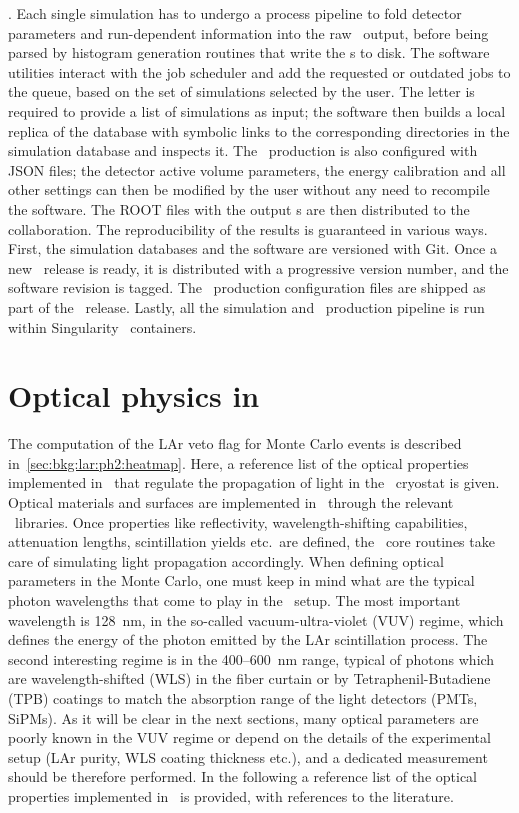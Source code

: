 $${}. Each single simulation has to undergo a process pipeline to fold detector parameters
and run-dependent information into the raw \mage\ output, before being parsed by histogram
generation routines that write the \pdf{}s to disk. The software utilities interact with the
job scheduler and add the requested or outdated jobs to the queue, based on the set of
simulations selected by the user. The letter is required to provide a list of simulations
as input; the software then builds a local replica of the database with symbolic links to
the corresponding directories in the simulation database and inspects it. The \pdf\
production is also configured with JSON files; the detector active volume parameters, the
energy calibration and all other settings can then be modified by the user without any
need to recompile the software. The ROOT files with the output \pdf{}s are then distributed
to the collaboration.
\newpar
The reproducibility of the results is guaranteed in various ways. First, the simulation
databases and the software are versioned with Git. Once a new \pdf\ release is ready, it is
distributed with a progressive version number, and the software revision is tagged. The
\pdf\ production configuration files are shipped as part of the \pdf\ release. Lastly, all the
simulation and \pdf\ production pipeline is run within Singularity~\cite{Kurtzer2017,
Singularity2020} containers.

\section{Optical physics in \mage}%
\label{sec:apdx:mage-optics}

The computation of the LAr veto flag for Monte Carlo events is described
in~\cref{sec:bkg:lar:ph2:heatmap}. Here, a reference list of the optical properties
implemented in \mage\ that regulate the propagation of light in the \gerda\ cryostat is
given.
\newpar
Optical materials and surfaces are implemented in \mage\ through the relevant \geant\
libraries. Once properties like reflectivity, wavelength-shifting capabilities,
attenuation lengths, scintillation yields etc.~are defined, the \geant\ core routines take
care of simulating light propagation accordingly. When defining optical parameters in the
Monte Carlo, one must keep in mind what are the typical photon wavelengths that come to
play in the \gerda\ setup. The most important wavelength is 128~nm, in the so-called
vacuum-ultra-violet (VUV) regime, which defines the energy of the photon emitted by the
LAr scintillation process. The second interesting regime is in the 400--600~nm range,
typical of photons which are wavelength-shifted (WLS) in the fiber curtain or by
Tetraphenil-Butadiene (TPB) coatings to match the absorption range of the light detectors
(PMTs, SiPMs). As it will be clear in the next sections, many optical parameters are
poorly known in the VUV regime or depend on the details of the experimental setup (LAr
purity, WLS coating thickness etc.), and a dedicated measurement should be therefore
performed. In the following a reference list of the optical properties implemented in
\mage\ is provided, with references to the literature.

